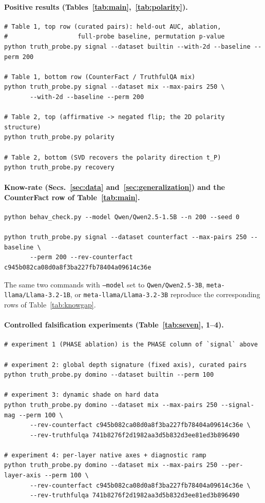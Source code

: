 \documentclass[11pt]{article}
\begin{document}
\paragraph{Positive results (Tables~\ref{tab:main},~\ref{tab:polarity}).}
\begin{verbatim}
# Table 1, top row (curated pairs): held-out AUC, ablation,
#                   full-probe baseline, permutation p-value
python truth_probe.py signal --dataset builtin --with-2d --baseline --perm 200

# Table 1, bottom row (CounterFact / TruthfulQA mix)
python truth_probe.py signal --dataset mix --max-pairs 250 \
       --with-2d --baseline --perm 200

# Table 2, top (affirmative -> negated flip; the 2D polarity structure)
python truth_probe.py polarity

# Table 2, bottom (SVD recovers the polarity direction t_P)
python truth_probe.py recovery
\end{verbatim}

\paragraph{Know-rate (Secs.~\ref{sec:data} and~\ref{sec:generalization}) and the CounterFact row of Table~\ref{tab:main}.}
\begin{verbatim}
python behav_check.py --model Qwen/Qwen2.5-1.5B --n 200 --seed 0

python truth_probe.py signal --dataset counterfact --max-pairs 250 --baseline \
       --perm 200 --rev-counterfact c945b082ca08d0a8f3ba227fb78404a09614c36e
\end{verbatim}
The same two commands with \texttt{--model} set to \texttt{Qwen/Qwen2.5-3B},
\texttt{meta-llama/Llama-3.2-1B}, or \texttt{meta-llama/Llama-3.2-3B}
reproduce the corresponding rows of Table~\ref{tab:knowgap}.

\paragraph{Controlled falsification experiments (Table~\ref{tab:seven}, 1--4).}
\begin{verbatim}
# experiment 1 (PHASE ablation) is the PHASE column of `signal` above

# experiment 2: global depth signature (fixed axis), curated pairs
python truth_probe.py domino --dataset builtin --perm 100

# experiment 3: dynamic shade on hard data
python truth_probe.py domino --dataset mix --max-pairs 250 --signal-mag --perm 100 \
       --rev-counterfact c945b082ca08d0a8f3ba227fb78404a09614c36e \
       --rev-truthfulqa 741b8276f2d1982aa3d5b832d3ee81ed3b896490

# experiment 4: per-layer native axes + diagnostic ramp
python truth_probe.py domino --dataset mix --max-pairs 250 --per-layer-axis --perm 100 \
       --rev-counterfact c945b082ca08d0a8f3ba227fb78404a09614c36e \
       --rev-truthfulqa 741b8276f2d1982aa3d5b832d3ee81ed3b896490
\end{verbatim}
\end{document}
